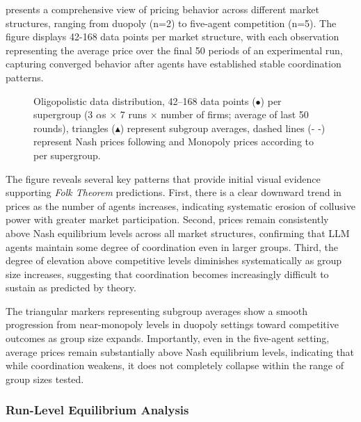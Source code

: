  presents a comprehensive view of pricing behavior across different market structures, ranging from duopoly (n=2) to five-agent competition (n=5). The figure displays 42-168 data points per market structure, with each observation representing the average price over the final 50 periods of an experimental run, capturing converged behavior after agents have established stable coordination patterns.

\begin{figure}[htpb!]
    \centering
    
    \caption{Oligopolistic data distribution, 42--168 data points ($\bullet$) per supergroup (3 $\alpha$s $\times$ 7 runs $\times$ number of firms; average of last 50 rounds), triangles ($\blacktriangle$) represent subgroup averages, dashed lines ($\text{- -}$) represent Nash prices following  and Monopoly prices according to  per supergroup.}
    \label{fig:oligopols}
\end{figure}

The figure reveals several key patterns that provide initial visual evidence supporting \emph{Folk Theorem} predictions. First, there is a clear downward trend in prices as the number of agents increases, indicating systematic erosion of collusive power with greater market participation. Second, prices remain consistently above Nash equilibrium levels across all market structures, confirming that LLM agents maintain some degree of coordination even in larger groups. Third, the degree of elevation above competitive levels diminishes systematically as group size increases, suggesting that coordination becomes increasingly difficult to sustain as predicted by theory.

The triangular markers representing subgroup averages show a smooth progression from near-monopoly levels in duopoly settings toward competitive outcomes as group size expands. Importantly, even in the five-agent setting, average prices remain substantially above Nash equilibrium levels, indicating that while coordination weakens, it does not completely collapse within the range of group sizes tested.

\subsubsection*{Run-Level Equilibrium Analysis}

